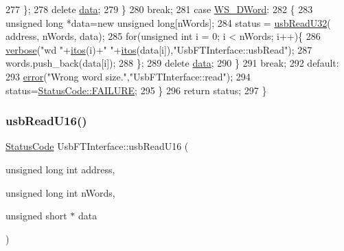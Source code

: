 \begin{DoxyCode}
277       \};
278       \textcolor{keyword}{delete} \hyperlink{namespaceshell_a5ea2525995cedc3efd69ea8a7f034d1e}{data};
279     \}
280     \textcolor{keywordflow}{break};
281   \textcolor{keywordflow}{case} \hyperlink{classUsbFTInterface_a057387f452eaac094fb77ba09cf1cf2eae8012559bbaaae91ac6208ed7b3ffe89}{WS\_DWord}:
282     \{
283       \textcolor{keywordtype}{unsigned} \textcolor{keywordtype}{long} *data=\textcolor{keyword}{new} \textcolor{keywordtype}{unsigned} \textcolor{keywordtype}{long}[nWords];
284       status = \hyperlink{classUsbFTInterface_a7eadb8a94323fada4c72ed1c992792cc}{usbReadU32}( address, nWords, data);
285       \textcolor{keywordflow}{for}(\textcolor{keywordtype}{unsigned} \textcolor{keywordtype}{int} i = 0; i < nWords; i++)\{
286         \hyperlink{classObject_a83d2db2df682907ea1115ad721c1c4a1}{verbose}(\textcolor{stringliteral}{"wd "}+\hyperlink{Tools_8h_af330027dbdafb9a30768b3613c553e60}{itos}(i)+\textcolor{stringliteral}{" "}+\hyperlink{Tools_8h_af330027dbdafb9a30768b3613c553e60}{itos}(data[i]),\textcolor{stringliteral}{"UsbFTInterface::usbRead"});
287         words.push\_back(data[i]);
288       \};
289       \textcolor{keyword}{delete} \hyperlink{namespaceshell_a5ea2525995cedc3efd69ea8a7f034d1e}{data};
290     \}
291     \textcolor{keywordflow}{break};
292   \textcolor{keywordflow}{default}:
293     \hyperlink{classObject_a204a95f57818c0f811933917a30eff45}{error}(\textcolor{stringliteral}{"Wrong word size."},\textcolor{stringliteral}{"UsbFTInterface::read"});
294     status=\hyperlink{classStatusCode_a6f565cbeadc76d14c72f047e5e85eb4ba3da73d4c469762eb9d3c960368252b26}{StatusCode::FAILURE};
295   \}
296   \textcolor{keywordflow}{return} status;
297 \}
\end{DoxyCode}
\mbox{\label{classUsbFTInterface_ae17381a2ca14b9acac9faa10c3e430db}} 
\subsubsection{\texorpdfstring{usb\+Read\+U16()}{usbReadU16()}}
{\footnotesize\ttfamily \hyperlink{classStatusCode}{Status\+Code} Usb\+F\+T\+Interface\+::usb\+Read\+U16 (\begin{DoxyParamCaption}\item[{unsigned long int}]{address,  }\item[{unsigned long int}]{n\+Words,  }\item[{unsigned short $\ast$}]{data }\end{DoxyParamCaption})}




